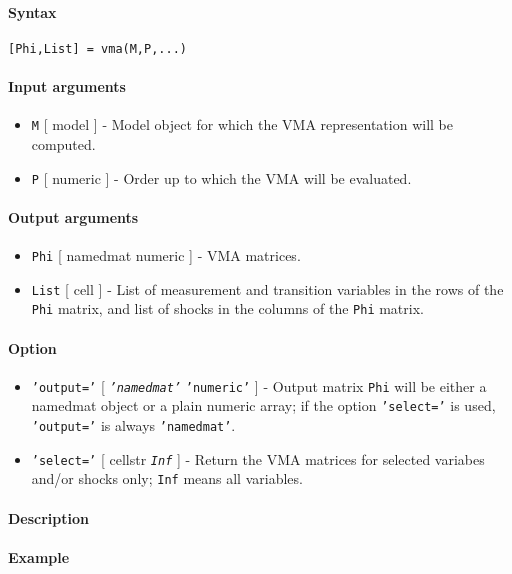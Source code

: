 


	\paragraph{Syntax}\label{syntax}

\begin{verbatim}
[Phi,List] = vma(M,P,...)
\end{verbatim}

\paragraph{Input arguments}\label{input-arguments}

\begin{itemize}
\item
  \texttt{M} {[} model {]} - Model object for which the VMA
  representation will be computed.
\item
  \texttt{P} {[} numeric {]} - Order up to which the VMA will be
  evaluated.
\end{itemize}

\paragraph{Output arguments}\label{output-arguments}

\begin{itemize}
\item
  \texttt{Phi} {[} namedmat \textbar{} numeric {]} - VMA matrices.
\item
  \texttt{List} {[} cell {]} - List of measurement and transition
  variables in the rows of the \texttt{Phi} matrix, and list of shocks
  in the columns of the \texttt{Phi} matrix.
\end{itemize}

\paragraph{Option}\label{option}

\begin{itemize}
\item
  \texttt{'output='} {[} \emph{\texttt{'namedmat'}} \textbar{}
  \texttt{'numeric'} {]} - Output matrix \texttt{Phi} will be either a
  namedmat object or a plain numeric array; if the option
  \texttt{'select='} is used, \texttt{'output='} is always
  \texttt{'namedmat'}.
\item
  \texttt{'select='} {[} cellstr \textbar{} \emph{\texttt{Inf}} {]} -
  Return the VMA matrices for selected variabes and/or shocks only;
  \texttt{Inf} means all variables.
\end{itemize}

\paragraph{Description}\label{description}

\paragraph{Example}\label{example}


